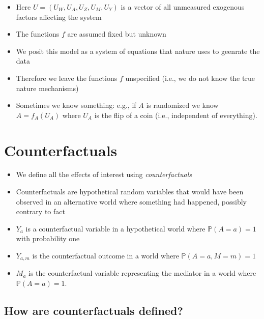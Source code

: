 \documentclass[
  12pt,
]{book}
\providecommand{\tightlist}{%
  \setlength{\itemsep}{0pt}\setlength{\parskip}{0pt}}
\theoremstyle{definition}
\theoremstyle{definition}
\theoremstyle{definition}
\renewcommand{\P}{\mathbb{P}}
\newcommand{\1}{\mathbbm{1}}
\begin{document}
\begin{itemize}
\tightlist
\item
  Here \(U=(U_W, U_A, U_Z, U_M, U_Y)\) is a vector of all unmeasured exogenous
  factors affecting the system
\item
  The functions \(f\) are assumed fixed but unknown
\item
  We posit this model as a system of equations that nature uses to geenrate the
  data
\item
  Therefore we leave the functions \(f\) unspecified (i.e., we do not know the
  true nature mechanisms)
\item
  Sometimes we know something: e.g., if \(A\) is randomized we know \(A=f_A(U_A)\)
  where \(U_A\) is the flip of a coin (i.e., independent of everything).
\end{itemize}

\hypertarget{counterfactuals}{%
\section{Counterfactuals}\label{counterfactuals}}

\begin{itemize}
\tightlist
\item
  We define all the effects of interest using \emph{counterfactuals}
\item
  Counterfactuals are hypothetical random variables that would have been
  observed in an alternative world where something had happened, possibly
  contrary to fact 
\item
  \(Y_a\) is a counterfactual variable in a hypothetical world where \(\P(A=a)=1\)
  with probability one
\item
  \(Y_{a,m}\) is the counterfactual outcome in a world where \(\P(A=a,M=m)=1\)
\item
  \(M_a\) is the counterfactual variable representing the mediator in a world
  where \(\P(A=a)=1\).
\end{itemize}

\hypertarget{how-are-counterfactuals-defined}{%
\subsection{How are counterfactuals defined?}\label{how-are-counterfactuals-defined}}
\end{document}
